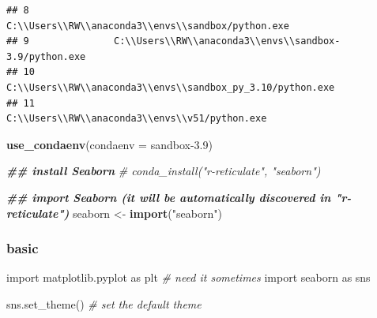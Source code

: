 \documentclass[
]{book}
\newenvironment{Shaded}{\begin{snugshade}}{\end{snugshade}}
\newcommand{\AttributeTok}[1]{\textcolor[rgb]{0.13,0.29,0.53}{#1}}
\newcommand{\CommentTok}[1]{\textcolor[rgb]{0.56,0.35,0.01}{\textit{#1}}}
\newcommand{\DocumentationTok}[1]{\textcolor[rgb]{0.56,0.35,0.01}{\textbf{\textit{#1}}}}
\newcommand{\FunctionTok}[1]{\textcolor[rgb]{0.13,0.29,0.53}{\textbf{#1}}}
\newcommand{\ImportTok}[1]{#1}
\newcommand{\NormalTok}[1]{#1}
\newcommand{\OtherTok}[1]{\textcolor[rgb]{0.56,0.35,0.01}{#1}}
\newcommand{\StringTok}[1]{\textcolor[rgb]{0.31,0.60,0.02}{#1}}
\theoremstyle{definition}
\theoremstyle{definition}
\theoremstyle{definition}
\theoremstyle{definition}
\theoremstyle{remark}
\begin{document}
\begin{verbatim}
## 8                   C:\\Users\\RW\\anaconda3\\envs\\sandbox/python.exe
## 9               C:\\Users\\RW\\anaconda3\\envs\\sandbox-3.9/python.exe
## 10          C:\\Users\\RW\\anaconda3\\envs\\sandbox_py_3.10/python.exe
## 11                      C:\\Users\\RW\\anaconda3\\envs\\v51/python.exe
\end{verbatim}

\begin{Shaded}
\begin{Highlighting}[]
\FunctionTok{use\_condaenv}\NormalTok{(}\AttributeTok{condaenv =} \StringTok{\textquotesingle{}sandbox{-}3.9\textquotesingle{}}\NormalTok{)}

\DocumentationTok{\#\# install Seaborn}
\CommentTok{\# conda\_install("r{-}reticulate", "seaborn")}

\DocumentationTok{\#\# import Seaborn (it will be automatically discovered in "r{-}reticulate")}
\NormalTok{seaborn }\OtherTok{\textless{}{-}} \FunctionTok{import}\NormalTok{(}\StringTok{"seaborn"}\NormalTok{)}
\end{Highlighting}
\end{Shaded}

\hypertarget{basic}{%
\subsubsection{basic}\label{basic}}

\begin{Shaded}
\begin{Highlighting}[]
\ImportTok{import}\NormalTok{ matplotlib.pyplot }\ImportTok{as}\NormalTok{ plt  }\CommentTok{\# need it sometimes}
\ImportTok{import}\NormalTok{ seaborn }\ImportTok{as}\NormalTok{ sns}

\NormalTok{sns.set\_theme() }\CommentTok{\# set the default theme}
\end{Highlighting}
\end{Shaded}
\end{document}
